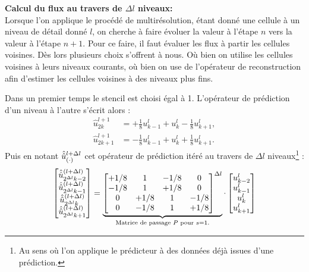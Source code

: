             \textbf{Calcul du flux au travers de $\Delta l$ niveaux:\\}
            Lorsque l'on applique le procédé de multirésolution, étant donné une cellule à un niveau de détail donné $l$, on cherche à faire évoluer la valeur à l'étape $n$ vers la valeur à l'étape $n+1$. 
            Pour ce faire, il faut évaluer les flux à partir les cellules voisines. Dès lors plusieurs choix s'offrent à nous. Où bien on utilise les cellules voisines à leurs niveaux courants, où bien on use de l'opérateur 
            de reconstruction afin d'estimer les cellules voisines à des niveaux plus fins.\par
            Dans un premier temps le stencil est choisi égal à 1. L'opérateur de prédiction d'un niveau à l'autre s'écrit alors : 
            \begin{align}
                \hat u^{l+1}_{2k} &= +\frac{1}{8} u^l_{k-1} + u^l_k - \frac{1}{8} u^l_{k+1},\\
                \hat u^{l+1}_{2k+1} &= -\frac{1}{8} u^l_{k-1} + u^l_k + \frac{1}{8} u^l_{k+1}.
            \end{align}
            Puis en notant $\hat{\hat{u}}^{l+\Delta l}_{(\cdot)}$ cet opérateur de prédiction itéré au travers de $\Delta l$ niveaux\footnote{
                Au sens où l'on applique le prédicteur à des données déjà issues d'une prédiction.
            } : 
            \begin{align}
                \begin{bmatrix}
                    \hat{\hat{u}}^{(l+\Delta l)}_{2^{\Delta l}k-2}\\
                    \hat{\hat{u}}^{(l+\Delta l)}_{2^{\Delta l}k-1}\\
                    \hat{\hat{u}}^{(l+\Delta l)}_{2^{\Delta l}k}\\
                    \hat{\hat{u}}^{(l+\Delta l)}_{2^{\Delta l}k+1}\\
                \end{bmatrix}
                    =
                \underbrace{
                \begin{bmatrix}
                    +1/8 & 1 & -1/8 & 0 \\
                    -1/8 & 1 & +1/8 & 0 \\
                    0 & +1/8 & 1 & -1/8 \\
                    0 & -1/8 & 1 & +1/8 
                \end{bmatrix}^{\Delta l}}_{\text{Matrice de passage } P \text{ pour }s=1.}
                \cdot
                \begin{bmatrix}
                    u^l_{k-2}\\
                    u^l_{k-1}\\
                    u^l_{k}\\
                    u^l_{k+1}\\
                \end{bmatrix}
            \end{align}

